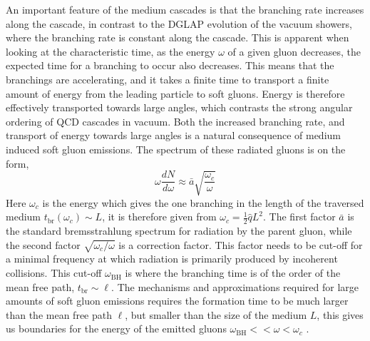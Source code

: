 \documentclass[main.tex]{subfiles}
\begin{document}
An important feature of the medium cascades is that the branching rate increases along the cascade, in contrast to the DGLAP evolution of the vacuum showers, where the branching rate is constant along the cascade. This is apparent when looking at the characteristic time, as the energy \(\omega\) of a given gluon decreases, the expected time for a branching to occur also decreases. This means that the branchings are accelerating, and it takes a finite time to transport a finite amount of energy from the leading particle to soft gluons. Energy is therefore effectively transported towards large angles, which contrasts the strong angular ordering of QCD cascades in vacuum. Both the increased branching rate, and transport of energy towards large angles is a natural consequence of medium induced soft gluon emissions. The spectrum of these radiated gluons is on the form, 
\begin{equation}
    \omega \frac{dN}{d\omega} \approx \bar a \sqrt{\frac{\omega_c}{\omega}}
\end{equation}
Here \(\omega_c\) is the energy which gives the one branching in the length of the traversed medium \(t_{\text{br}}(\omega_c) \sim L\), it is therefore given from \(\omega_c = \frac{1}{2} \hat q L^2\). The first factor \(\bar a\) is the standard bremsstrahlung spectrum for radiation by the parent gluon, while the second factor \(\sqrt{\omega_c/\omega}\) is a correction factor. This factor needs to be cut-off for a minimal frequency at which radiation is primarily produced by incoherent collisions. This cut-off \(\omega_{\text{BH}}\) is where the branching time is of the order of the mean free path, \(t_{\text{br}} \sim \ell\). The mechanisms and approximations required for large amounts of soft gluon emissions requires the formation time to be much larger than the mean free path \(\ell\), but smaller than the size of the medium \(L\), this gives us boundaries for the energy of the emitted gluons \(\omega_{\text{BH}} << \omega < \omega_c\) \cite{medium_induced_gluon_branching}.

\end{document}
